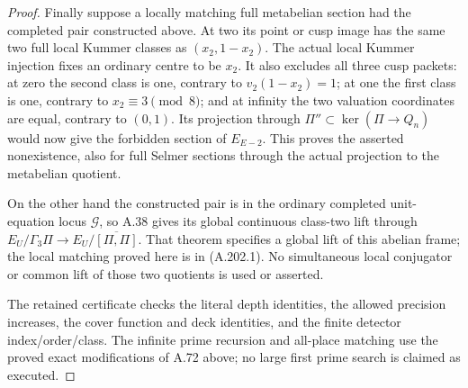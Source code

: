 \begin{proof}
Finally suppose a locally matching full metabelian section had
the completed pair constructed above.  At two its point or cusp
image has the same two full local Kummer classes as
\((x_2,1-x_2)\).  The actual local Kummer injection fixes an
ordinary centre to be \(x_2\).  It also excludes all three
cusp packets: at zero the second class is one, contrary to
\(v_2(1-x_2)=1\); at one the first class is one, contrary
to \(x_2\equiv3\pmod8\); and at infinity the two valuation
coordinates are equal, contrary to \((0,1)\).
Its projection through \(\Pi''\subset\ker(\Pi\to Q_n)\)
would now give the forbidden section of \(E_{E-2}\).
This proves the asserted nonexistence, also for full Selmer
sections through the actual projection to the metabelian quotient.

On the other hand the constructed pair is in the ordinary
completed unit-equation locus \(\mathcal G\), so A.38 gives
its global continuous class-two lift through
\(E_U/\Gamma_3\Pi\to E_U/\overline{[\Pi,\Pi]}\).
That theorem specifies a global lift of this abelian frame;
the local matching proved here is in (A.202.1).
No simultaneous local conjugator or common lift of those two
quotients is used or asserted.

The retained certificate
checks the literal depth identities, the allowed precision
increases, the cover function and deck identities, and the
finite detector index/order/class.  The infinite prime recursion
and all-place matching use the proved exact modifications of
A.72 above; no large first prime search is claimed as executed.
\end{proof}
